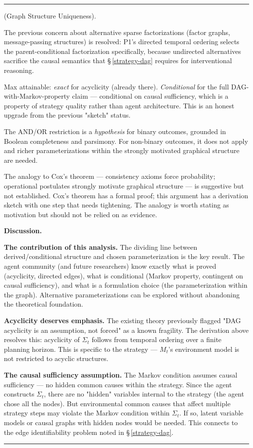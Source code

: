 \documentclass[11pt,oneside]{article}
\newcounter{claim}[section]
\renewcommand{\theclaim}{\thesection.\arabic{claim}}
\newenvironment{segment}[2]{%
  \refstepcounter{claim}%
  \bigskip\noindent\hrule\smallskip
  \noindent{\bfseries #1~\theclaim}\enskip(#2).\par\smallskip
  \noindent\ignorespaces
}{%
  \par\smallskip\noindent\hrule\bigskip
}
\newenvironment{derivation}[1][]{\begin{segment}{Derivation}{#1}}{\end{segment}}
\begin{document}
\begin{derivation}[Graph Structure Uniqueness]
The previous concern about alternative sparse factorizations (factor graphs, message-passing structures) is resolved: P1's directed temporal ordering selects the parent-conditional factorization specifically, because undirected alternatives sacrifice the causal semantics that \S\,\ref{strategy-dag} requires for interventional reasoning.

Max attainable: \textit{exact} for acyclicity (already there). \textit{Conditional} for the full DAG-with-Markov-property claim — conditional on causal sufficiency, which is a property of strategy quality rather than agent architecture. This is an honest upgrade from the previous "sketch" status.

The AND/OR restriction is a \textit{hypothesis} for binary outcomes, grounded in Boolean completeness and parsimony. For non-binary outcomes, it does not apply and richer parameterizations within the strongly motivated graphical structure are needed.

The analogy to Cox's theorem — consistency axioms force probability; operational postulates strongly motivate graphical structure — is suggestive but not established. Cox's theorem has a formal proof; this argument has a derivation sketch with one step that needs tightening. The analogy is worth stating as motivation but should not be relied on as evidence.


\medskip\noindent\textbf{Discussion.}


\textbf{The contribution of this analysis.} The dividing line between derived/conditional structure and chosen parameterization is the key result. The agent community (and future researchers) know exactly what is proved (acyclicity, directed edges), what is conditional (Markov property, contingent on causal sufficiency), and what is a formulation choice (the parameterization within the graph). Alternative parameterizations can be explored without abandoning the theoretical foundation.

\textbf{Acyclicity deserves emphasis.} The existing theory previously flagged "DAG acyclicity is an assumption, not forced" as a known fragility. The derivation above resolves this: acyclicity of $\Sigma_t$ follows from temporal ordering over a finite planning horizon. This is specific to the strategy — $M_t$'s environment model is not restricted to acyclic structures.

\textbf{The causal sufficiency assumption.} The Markov condition assumes causal sufficiency — no hidden common causes within the strategy. Since the agent constructs $\Sigma_t$, there are no "hidden" variables internal to the strategy (the agent chose all the nodes). But environmental common causes that affect multiple strategy steps may violate the Markov condition within $\Sigma_t$. If so, latent variable models or causal graphs with hidden nodes would be needed. This connects to the edge identifiability problem noted in \S\,\ref{strategy-dag}.

\end{derivation}
\end{document}
